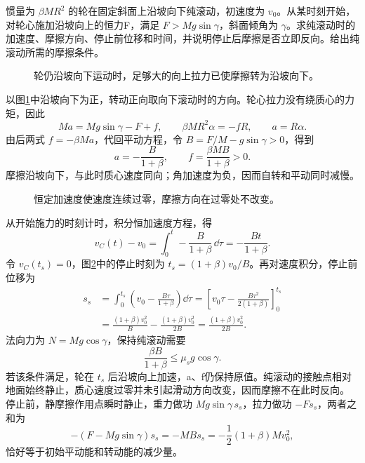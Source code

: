 \begin{exercise}[减速、停止与反向滚动]\label{deep6:problem-exercise-12}\label{deep6:ex:d5-h12}
惯量为 $\beta MR^2$ 的轮在固定斜面上沿坡向下纯滚动，初速度为 $v_0$。从某时刻开始，对轮心施加沿坡向上的恒力F，满足 $F>Mg\sin\gamma$，斜面倾角为 $\gamma$。求纯滚动时的加速度、摩擦方向、停止前位移和时间，并说明停止后摩擦是否立即反向。给出纯滚动所需的摩擦条件。
\end{exercise}
\begin{figure}[H]\centering
{}
\caption{轮仍沿坡向下运动时，足够大的向上拉力已使摩擦转为沿坡向下。}\label{deep6:fig:d5-h12-q}
\end{figure}
\begin{solution}
以图\ref{deep6:fig:d5-h12-q}中沿坡向下为正，转动正向取向下滚动时的方向。轮心拉力没有绕质心的力矩，因此
\[
Ma=Mg\sin\gamma-F+f,\qquad
\beta MR^2\alpha=-fR,\qquad a=R\alpha.
\]
由后两式 $f=-\beta Ma$，代回平动方程，令 $B=F/M-g\sin\gamma>0$，得到
\[
a=-\frac B{1+\beta},\qquad
f=\frac{\beta MB}{1+\beta}>0.
\]
摩擦沿坡向下，与此时质心速度同向；角加速度为负，因而自转和平动同时减慢。
\begin{figure}[H]\centering
{}
\caption{恒定加速度使速度连续过零，摩擦方向在过零处不改变。}\label{deep6:fig:d5-h12-s}
\end{figure}
从开始施力的时刻计时，积分恒加速度方程，得
\[
v_C(t)-v_0=\int_0^t-\frac{B}{1+\beta}\,\dd\tau
=-\frac{Bt}{1+\beta}.
\]
令 $v_C(t_s)=0$，图\ref{deep6:fig:d5-h12-s}中的停止时刻为 $t_s=(1+\beta)v_0/B$。再对速度积分，停止前位移为
\[
\begin{aligned}
s_s&=\int_0^{t_s}\left(v_0-\frac{B\tau}{1+\beta}\right)\dd\tau
=\left[v_0\tau-\frac{B\tau^2}{2(1+\beta)}\right]_0^{t_s}\\
&=\frac{(1+\beta)v_0^2}{B}-\frac{(1+\beta)v_0^2}{2B}
=\frac{(1+\beta)v_0^2}{2B}.
\end{aligned}
\]
法向力为 $N=Mg\cos\gamma$，保持纯滚动需要
\[
\frac{\beta B}{1+\beta}\le\mu_sg\cos\gamma.
\]
若该条件满足，轮在 $t_s$ 后沿坡向上加速，a、f仍保持原值。纯滚动的接触点相对地面始终静止，质心速度过零并未引起滑动方向改变，因而摩擦不在此时反向。
停止前，静摩擦作用点瞬时静止，重力做功 $Mg\sin\gamma\,s_s$，拉力做功 $-Fs_s$，两者之和为
\[
-(F-Mg\sin\gamma)s_s=-MBs_s
=-\frac12(1+\beta)Mv_0^2,
\]
恰好等于初始平动能和转动能的减少量。
\end{solution}


